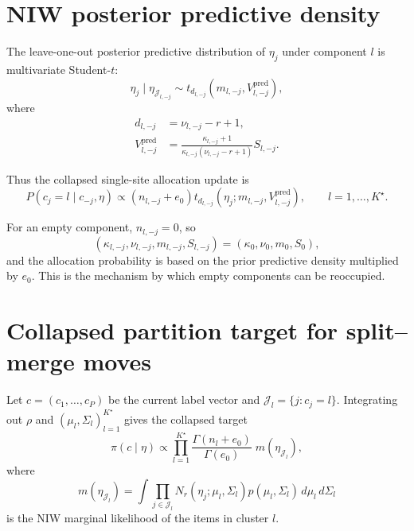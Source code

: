 \documentclass[11pt]{article}
\begin{document}
\section{NIW posterior predictive density}

The leave-one-out posterior predictive distribution of $\eta_j$ under
component $l$ is multivariate Student-$t$:
\begin{equation}
    \eta_j\mid \eta_{\mathcal J_{l,-j}}
    \sim
    t_{d_{l,-j}}
    \left(
    m_{l,-j},
    V^{\mathrm{pred}}_{l,-j}
    \right),
    \label{eq:niw-predictive}
\end{equation}
where
\begin{align}
    d_{l,-j} &= \nu_{l,-j}-r+1,\\
    V^{\mathrm{pred}}_{l,-j}
    &=
    \frac{\kappa_{l,-j}+1}
    {\kappa_{l,-j}(\nu_{l,-j}-r+1)}S_{l,-j}.
\end{align}

Thus the collapsed single-site allocation update is
\begin{equation}
    P(c_j=l\mid c_{-j},\eta)
    \propto
    (n_{l,-j}+e_0)
    t_{d_{l,-j}}
    \left(
    \eta_j;
    m_{l,-j},
    V^{\mathrm{pred}}_{l,-j}
    \right),
    \qquad l=1,\dots,K^\star.
    \label{eq:collapsed-c-update}
\end{equation}

For an empty component, $n_{l,-j}=0$, so
\[
    (\kappa_{l,-j},\nu_{l,-j},m_{l,-j},S_{l,-j})
    =(\kappa_0,\nu_0,m_0,S_0),
\]
and the allocation probability is based on the prior predictive density
multiplied by $e_0$.  This is the mechanism by which empty components can be
reoccupied.

\section{Collapsed partition target for split--merge moves}

Let $c=(c_1,\dots,c_P)$ be the current label vector and
$\mathcal J_l=\{j:c_j=l\}$.  Integrating out $\rho$ and
$(\mu_l,\Sigma_l)_{l=1}^{K^\star}$ gives the collapsed target
\begin{equation}
    \pi(c\mid\eta)
    \propto
    \prod_{l=1}^{K^\star}
    \frac{\Gamma(n_l+e_0)}{\Gamma(e_0)}
    \;m(\eta_{\mathcal J_l}),
    \label{eq:collapsed-target}
\end{equation}
where
\[
    m(\eta_{\mathcal J_l})
    =
    \int
    \prod_{j\in\mathcal J_l}N_r(\eta_j;\mu_l,\Sigma_l)
    p(\mu_l,\Sigma_l)\,d\mu_l\,d\Sigma_l
\]
is the NIW marginal likelihood of the items in cluster $l$.
\end{document}

